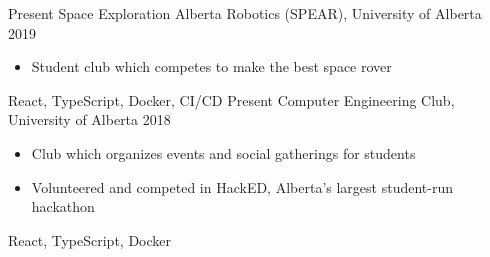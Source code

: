 
\begin{experiences}
  \experience
    {Present}   {Space Exploration Alberta Robotics (SPEAR), }{University of Alberta}{}
    {2019} {
                      \begin{itemize}
                        \item Student club which competes to make the best space rover
                      \end{itemize}
                    }
                    {
                        React,
                        TypeScript,
                        Docker,
                        CI/CD
                    }
  \experience
  {Present}   {Computer Engineering Club, }{University of Alberta}{}
  {2018} {
                    \begin{itemize}
                      \item Club which organizes events and social gatherings for students
                      \item Volunteered and competed in HackED, Alberta's largest student-run hackathon
                    \end{itemize}
                  }
                  {
                      React,
                      TypeScript,
                      Docker
                  }

\end{experiences}

